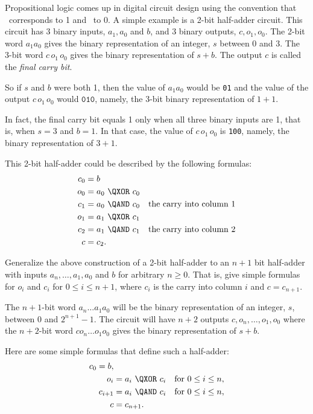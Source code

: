 \documentclass[handout]{mcs}
\begin{document}
\begin{problem}
  Propositional logic comes up in digital circuit design using the
  convention that \true\ corresponds to 1 and \false\ to 0.  A simple
  example is a 2-bit half-adder circuit.  This circuit has $3$ binary
  inputs, $a_1,a_0$ and $b$, and $3$ binary outputs, $c, o_1,o_0$.  The
  2-bit word $a_1a_0$ gives the binary representation of an integer, $s$
  between 0 and 3.  The 3-bit word $c\, o_1\, o_0$ gives the binary
  representation of $s+b$.
  The output $c$ is called the \emph{final carry bit}.

  So if $s$ and $b$ were both 1, then the value of $a_1a_0$ would be
  \texttt{01} and the value of the output $c\, o_1\, o_0$ would
  $\texttt{010}$, namely, the 3-bit binary representation of $1+1$.

  In fact, the final carry bit equals 1 only when all three binary inputs
  are 1, that is, when $s=3$ and $b=1$.  In that case, the value of $c\,
  o_1\, o_0$ is \texttt{100}, namely, the binary representation of $3+1$.

  This 2-bit half-adder could be described by the following formulas:
\begin{align*}
c_0 & = b \\
o_0 & = a_0\ \QXOR\ c_0\\
c_1 & = a_0\ \QAND\ c_0  & \text{the carry into  column 1}\\
o_1 & = a_1\ \QXOR\ c_1\\
c_2 & = a_1\ \QAND\ c_1 & \text{the carry into column 2}\\
c   & = c_2.
\end{align*}

\bparts

\ppart\label{anb} Generalize the above construction of a 2-bit half-adder
to an $n+1$ bit half-adder with inputs $a_n,\dots, a_1, a_0$ and $b$ for
arbitrary $n \geq 0$.  That is, give simple formulas for $o_{i}$ and
$c_{i}$ for $0 \leq i \leq n+1$, where $c_i$ is the carry into column $i$
and $c=c_{n+1}$.

\begin{solution}
 The $n+1$-bit word $a_n \dots a_1 a_0$ will be the binary
  representation of an integer, $s$, between 0 and $2^{n+1}-1$.  The
  circuit will have $n+2$ outputs $c, o_n, \dots, o_1, o_0$ where the
  $n+2$-bit word $c o_n \dots o_1 o_0$ gives the binary representation of
  $s+b$.

Here are some simple formulas that define such a half-adder:
\begin{align*}
c_0 = b,\\
o_{i} & = a_{i}\ \QXOR\ c_{i}  & \text{for } 0 \leq i \leq n,\\
c_{i+1} &= a_i\ \QAND\ c_i & \text{for } 0 \leq i \leq n,\\
c & = c_{n+1}.
\end{align*}


\end{solution}
\end{problem}
\end{document}
